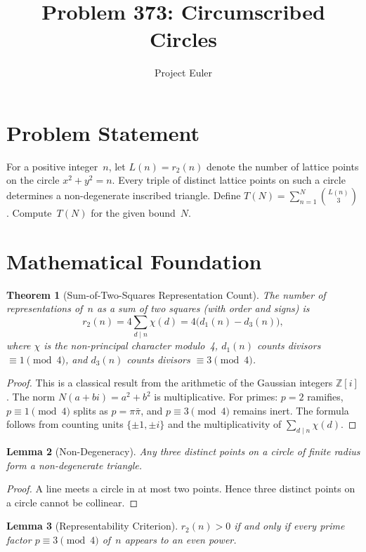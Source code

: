 \documentclass[12pt]{article}
\title{Problem 373: Circumscribed Circles}
\author{Project Euler}
\date{}
\newtheorem{theorem}{Theorem}
\newtheorem{lemma}[theorem]{Lemma}
\begin{document}
\maketitle

\section{Problem Statement}

For a positive integer~$n$, let $L(n) = r_2(n)$ denote the number of lattice points on the circle $x^2+y^2=n$. Every triple of distinct lattice points on such a circle determines a non-degenerate inscribed triangle. Define $T(N) = \sum_{n=1}^{N}\binom{L(n)}{3}$. Compute~$T(N)$ for the given bound~$N$.

\section{Mathematical Foundation}

\begin{theorem}[Sum-of-Two-Squares Representation Count]
The number of representations of~$n$ as a sum of two squares (with order and signs) is
\[
r_2(n) = 4\sum_{d \mid n}\chi(d) = 4\bigl(d_1(n) - d_3(n)\bigr),
\]
where $\chi$ is the non-principal character modulo~4, $d_1(n)$ counts divisors $\equiv 1\pmod{4}$, and $d_3(n)$ counts divisors $\equiv 3\pmod{4}$.
\end{theorem}

\begin{proof}
This is a classical result from the arithmetic of the Gaussian integers $\mathbb{Z}[i]$. The norm $N(a+bi)=a^2+b^2$ is multiplicative. For primes: $p=2$ ramifies, $p\equiv 1\pmod{4}$ splits as $p=\pi\bar\pi$, and $p\equiv 3\pmod{4}$ remains inert. The formula follows from counting units $\{\pm 1,\pm i\}$ and the multiplicativity of $\sum_{d\mid n}\chi(d)$.
\end{proof}

\begin{lemma}[Non-Degeneracy]
Any three distinct points on a circle of finite radius form a non-degenerate triangle.
\end{lemma}

\begin{proof}
A line meets a circle in at most two points. Hence three distinct points on a circle cannot be collinear.
\end{proof}

\begin{lemma}[Representability Criterion]
$r_2(n) > 0$ if and only if every prime factor $p\equiv 3\pmod{4}$ of~$n$ appears to an even power.
\end{lemma}
\end{document}
